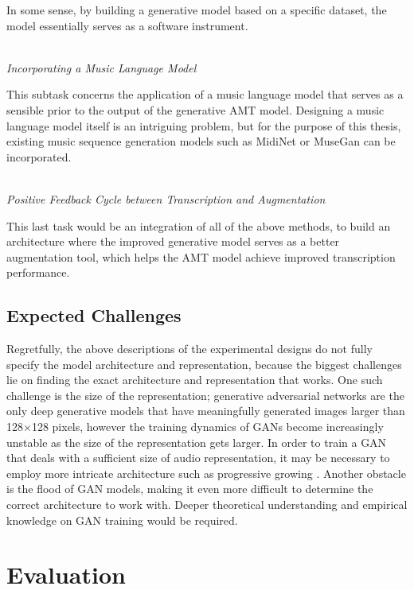 In some sense, by building a generative model based on a specific dataset, the model essentially serves as a software instrument.


\mbox{}\\\noindent\emph{Incorporating a Music Language Model}\mbox{}

This subtask concerns the application of a music language model that serves as a sensible prior to the output of the generative AMT model.
Designing a music language model itself is an intriguing problem, but for the purpose of this thesis, existing music sequence generation models such as MidiNet \cite{yang2017midinet} or MuseGan \cite{dong2017musegan} can be incorporated.

\mbox{}\\\noindent\emph{Positive Feedback Cycle between Transcription and Augmentation}\mbox{}

This last task would be an integration of all of the above methods, to build an architecture where the improved generative model serves as a better augmentation tool, which helps the AMT model achieve improved transcription performance.


\subsection{Expected Challenges}

Regretfully, the above descriptions of the experimental designs do not fully specify the model architecture and representation, because the biggest challenges lie on finding the exact architecture and representation that works.
One such challenge is the size of the representation; generative adversarial networks are the only deep generative models that have meaningfully generated images larger than 128$\times$128 pixels, however the training dynamics of GANs become increasingly unstable as the size of the representation gets larger.
In order to train a GAN that deals with a sufficient size of audio representation, it may be necessary to employ more intricate architecture such as progressive growing \cite{karras2017pggan}.
Another obstacle is the flood of GAN models, making it even more difficult to determine the correct architecture to work with.
Deeper theoretical understanding and empirical knowledge on GAN training would be required.

\section{Evaluation}


